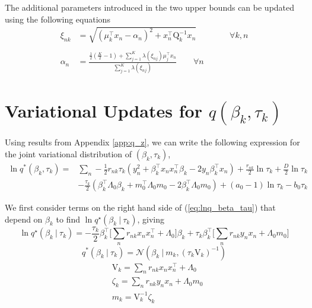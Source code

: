 \documentclass[twoside,11pt]{article}
\newcommand\given[1][]{\:#1\vert\:}
\newcommand{\transpose}[1]{#1^{\intercal}}
\begin{document}
The additional parameters introduced in the two upper bounds can be updated using the following equations
\begin{align*}
    \xi_{nk} & = \sqrt{\left(\mu_k^{\intercal}x_n - \alpha_n \right)^2 + x_n^{\intercal} \mathrm{Q}_k^{-1} x_n} \qquad \qquad \forall k, n \\ \\
    \alpha_n & = \frac{\frac{1}{2}\left( \frac{K}{2} - 1\right) + \sum_{j = 1}^K \lambda \left( \xi_{nj} \right)\mu_j^{\intercal} x_n}{\sum_{j=1}^{K} \lambda \left( \xi_{nj}\right)} \qquad \forall n
\end{align*}


\section{Variational Updates for $q(\beta_k, \tau_k)$} \label{app:beta_tau}  
Using results from Appendix \ref{app:q_z}, we can write the following expression for the joint variational distribution of $(\beta_k, \tau_k)$, 
\begin{equation} \label{eq:lnq_beta_tau}
\begin{split}
	\ln q^{*}(\beta_k, \tau_k) = & \sum_{n} -\frac{1}{2} r_{nk} \tau_k \left( y_n^2 + \transpose{\beta_k} x_n \transpose{x_n} \beta_k - 2y_n \transpose{\beta_k} x_n \right) + \frac{r_{nk}}{2} \ln \tau_k + \frac{D}{2} \ln \tau_k \\
	& - \frac{\tau_k}{2} \left( \transpose{\beta_k} \Lambda_0 \beta_k + \transpose{m_0} \Lambda_0 m_0 - 2\transpose{\beta_k}\Lambda_0m_0\right) + (a_0 - 1) \ln \tau_k - b_0 \tau_k
\end{split}
\end{equation}

We first consider terms on the right hand side of (\ref{eq:lnq_beta_tau}) that depend on $\beta_k$ to find $\ln q^{\star}(\beta_k \given \tau_k)$, giving
\begin{equation} \label{eq:lnq_beta}
	\ln q^{\star}(\beta_k \given \tau_k) = -\frac{\tau_k}{2} \transpose{\beta_k} \Big[ \sum_{n}r_{nk} x_n \transpose{x_n} + \Lambda_0 \Big] \beta_k + \tau_k \transpose{\beta_k} \Big[ \sum_{n} r_{nk}y_n x_n + \Lambda_0 m_0 \Big]
\end{equation}
\begin{equation} \label{q_beta}
	q^{*}(\beta_k \given \tau_k) = \mathcal{N}\left(\beta_k \given m_k, (\tau_k \mathrm{V}_k)^{-1} \right)
\end{equation}
\begin{equation} \label{eq:beta_params}
\begin{split}
    & \mathrm{V}_k = \sum_{n} r_{nk} x_n \transpose{x_n} + \Lambda_0 \\
 	& \zeta_k = \sum_{n} r_{nk} y_n x_n + \Lambda_0 m_0 \\
	& m_k = \mathrm{V}_k^{-1}  \zeta_k 
\end{split}
\end{equation}
\end{document}
